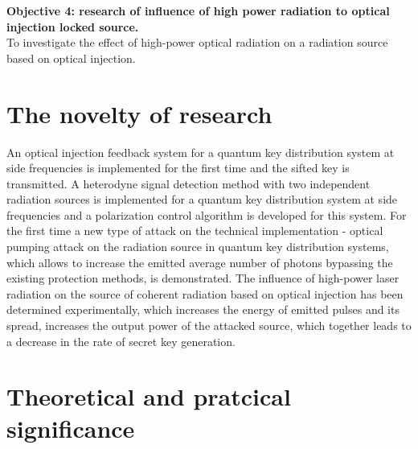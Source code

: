 \textbf{Objective 4: research of influence of high power radiation to optical injection locked source.}\\
To investigate the effect of high-power optical radiation on a radiation source based on optical injection.
\section*{The novelty of research}
An optical injection feedback system for a quantum key distribution system at side frequencies is implemented for the first time and the sifted key is transmitted. A heterodyne signal detection method with two independent radiation sources is implemented for a quantum key distribution system at side frequencies and a polarization control algorithm is developed for this system. For the first time a new type of attack on the technical implementation - optical pumping attack on the radiation source in quantum key distribution systems, which allows to increase the emitted average number of photons bypassing the existing protection methods, is demonstrated. The influence of high-power laser radiation on the source of coherent radiation based on optical injection has been determined experimentally, which increases the energy of emitted pulses and its spread, increases the output power of the attacked source, which together leads to a decrease in the rate of secret key generation.

\section*{Theoretical and pratcical significance}

